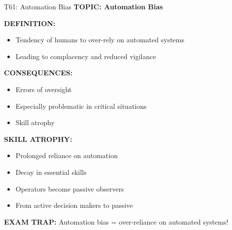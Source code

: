 \documentclass[8pt]{beamer}
\begin{document}
	\begin{frame}{T61: Automation Bias}
		\fontsize{6.5}{7.5}\selectfont
		\textbf{TOPIC: Automation Bias}
		
		\vspace{0.1cm}
		\textbf{DEFINITION:}
		\begin{itemize}
			\item Tendency of humans to over-rely on automated systems
			\item Leading to complacency and reduced vigilance
		\end{itemize}
		
		\vspace{0.1cm}
		\textbf{CONSEQUENCES:}
		\begin{itemize}
			\item Errors of oversight
			\item Especially problematic in critical situations
			\item Skill atrophy
		\end{itemize}
		
		\vspace{0.1cm}
		\textbf{SKILL ATROPHY:}
		\begin{itemize}
			\item Prolonged reliance on automation
			\item Decay in essential skills
			\item Operators become passive observers
			\item From active decision makers to passive
		\end{itemize}
		
		\textcolor{myred}{\textbf{EXAM TRAP:}} Automation bias = \textcolor{myblue}{over-reliance on automated systems}!
	\end{frame}
	
\end{document}
